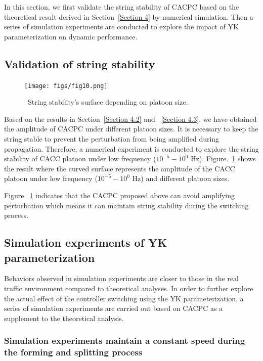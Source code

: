 \documentclass[a4paper,fleqn]{cas-sc}
\begin{document}
In this section, we first validate the string stability of CACPC based on the theoretical result derived in Section~\ref{Section 4} by numerical simulation. Then a series of simulation experiments are conducted to explore the impact of YK parameterization on dynamic performance.

\subsection{Validation of string stability}
\label{Section 5.1}

\begin{figure}
  \centering
  \texttt{[image: figs/fig10.png]}
  \caption{~String stability's surface depending on platoon size.}
  \label{fig10}
\end{figure}

Based on the results in Section~\ref{Section 4.2} and ~\ref{Section 4.3}, we have obtained the amplitude of CACPC under different platoon sizes. It is necessary to keep the string stable to prevent the perturbation from being amplified during propagation. Therefore, a numerical experiment is conducted to explore the string stability of CACC platoon under low frequency ($10^{-5} - 10^0$ Hz). Figure.~\ref{fig10} shows the result where the curved surface represents the amplitude of the CACC platoon under low frequency ($10^{-5} - 10^0$ Hz) and different platoon sizes.

Figure.~\ref{fig10} indicates that the CACPC proposed above can avoid amplifying perturbation which means it can maintain string stability during the switching process.

\subsection{Simulation experiments of YK parameterization}
\label{Section 5.2}

Behaviors observed in simulation experiments are closer to those in the real traffic environment compared to theoretical analyses. In order to further explore the actual effect of the controller switching using the YK parameterization, a series of simulation experiments are carried out based on CACPC as a supplement to the theoretical analysis.

\subsubsection{Simulation experiments maintain a constant speed during the forming and splitting process}
\label{Section 5.2.1}
\end{document}
